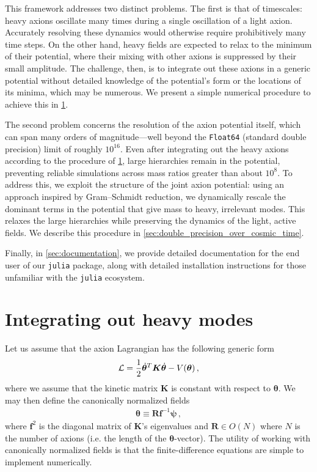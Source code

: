 \documentclass[11pt]{article}
\begin{document}
This framework addresses two distinct problems. The first is that of timescales: heavy axions oscillate many times during a single oscillation of a light axion. Accurately resolving these dynamics would otherwise require prohibitively many time steps. On the other hand, heavy fields are expected to relax to the minimum of their potential, where their mixing with other axions is suppressed by their small amplitude. The challenge, then, is to integrate out these axions in a generic potential without detailed knowledge of the potential’s form or the locations of its minima, which may be numerous. We present a simple numerical procedure to achieve this in \cref{sec:integrating_out_heavy_modes}.

The second problem concerns the resolution of the axion potential itself, which can span many orders of magnitude—well beyond the \texttt{Float64} (standard double precision) limit of roughly $10^{16}$. Even after integrating out the heavy axions according to the procedure of \cref{sec:integrating_out_heavy_modes}, large hierarchies remain in the potential, preventing reliable simulations across mass ratios greater than about $10^8$. To address this, we exploit the structure of the joint axion potential: using an approach inspired by Gram--Schmidt reduction, we dynamically rescale the dominant terms in the potential that give mass to heavy, irrelevant modes. This relaxes the large hierarchies while preserving the dynamics of the light, active fields. We describe this procedure in \cref{sec:double_precision_over_cosmic_time}.

Finally, in \cref{sec:documentation}, we provide detailed documentation for the end user of our \texttt{julia} package, along with detailed installation instructions for those unfamiliar with the \texttt{julia} ecosystem.

\section{Integrating out heavy modes}\label{sec:integrating_out_heavy_modes}
Let us assume that the axion Lagrangian has the following generic form
\begin{align}
    {\cal L} = \frac12\dot{\bm\theta}^T{\bm K}\dot{\bm\theta} - V(\bm\theta)\,,
\end{align}
where we assume that the kinetic matrix ${\bm K}$ is constant with respect to $\bm\theta$. We may then define the canonically normalized fields
\begin{align}
    {\bm\theta}\equiv \bm R\bm f^{-1}\bm \psi\,,
\end{align}
where $\bm f^2$ is the diagonal matrix of $\bm K$'s eigenvalues and $\bm R\in O(N)$ where $N$ is the number of axions (i.e. the length of the $\bm\theta$-vector). The utility of working with canonically normalized fields is that the finite-difference equations are simple to implement numerically.
\end{document}
